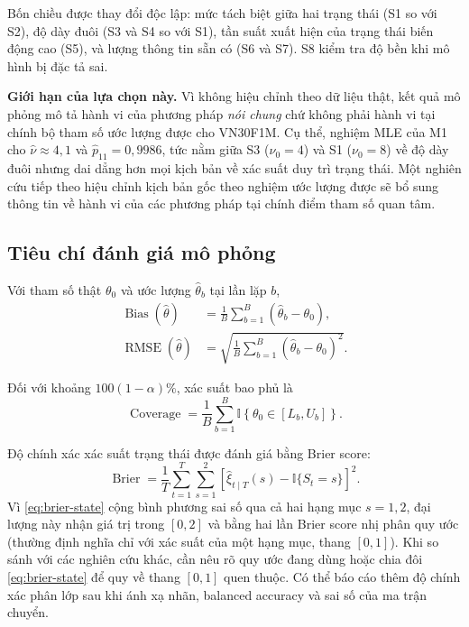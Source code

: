 \documentclass[12pt,a4paper]{article}
\numberwithin{equation}{section}
\newcommand{\RMSE}{\operatorname{RMSE}}
\newcommand{\ind}{\mathbb{I}}
\begin{document}
Bốn chiều được thay đổi độc lập: mức tách biệt giữa hai trạng thái (S1 so với S2), độ dày đuôi (S3 và S4 so với S1), tần suất xuất hiện của trạng thái biến động cao (S5), và lượng thông tin sẵn có (S6 và S7). S8 kiểm tra độ bền khi mô hình bị đặc tả sai.

\textbf{Giới hạn của lựa chọn này.} Vì không hiệu chỉnh theo dữ liệu thật, kết quả mô phỏng mô tả hành vi của phương pháp \emph{nói chung} chứ không phải hành vi tại chính bộ tham số ước lượng được cho VN30F1M. Cụ thể, nghiệm MLE của M1 cho $\hat\nu \approx 4{,}1$ và $\hat p_{11} = 0{,}9986$, tức nằm giữa S3 ($\nu_0 = 4$) và S1 ($\nu_0 = 8$) về độ dày đuôi nhưng dai dẳng hơn mọi kịch bản về xác suất duy trì trạng thái. Một nghiên cứu tiếp theo hiệu chỉnh kịch bản gốc theo nghiệm ước lượng được sẽ bổ sung thông tin về hành vi của các phương pháp tại chính điểm tham số quan tâm.

\subsection{Tiêu chí đánh giá mô phỏng}\label{subsec:simulation-metrics}

Với tham số thật $\theta_0$ và ước lượng $\widehat\theta_b$ tại lần lặp $b$,
\begin{align}
  \operatorname{Bias}(\widehat\theta)
  &=
  \frac{1}{B}\sum_{b=1}^{B}(\widehat\theta_b-\theta_0),
  \label{eq:bias}\\
  \RMSE(\widehat\theta)
  &=
  \sqrt{\frac{1}{B}\sum_{b=1}^{B}(\widehat\theta_b-\theta_0)^2}.
  \label{eq:parameter-rmse}
\end{align}

Đối với khoảng $100(1-\alpha)\%$, xác suất bao phủ là
\begin{equation}
  \operatorname{Coverage}
  =
  \frac{1}{B}
  \sum_{b=1}^{B}
  \ind\!\left\{
    \theta_0\in[L_b,U_b]
  \right\}.
  \label{eq:coverage}
\end{equation}

Độ chính xác xác suất trạng thái được đánh giá bằng Brier score:
\begin{equation}
  \operatorname{Brier}
  =
  \frac{1}{T}
  \sum_{t=1}^{T}
  \sum_{s=1}^{2}
  \left[
    \widehat\xi_{t\mid T}(s)-\ind\{S_t=s\}
  \right]^2.
  \label{eq:brier-state}
\end{equation}
Vì \cref{eq:brier-state} cộng bình phương sai số qua cả hai hạng mục $s=1,2$, đại lượng này nhận giá trị trong $[0,2]$ và bằng hai lần Brier score nhị phân quy ước (thường định nghĩa chỉ với xác suất của một hạng mục, thang $[0,1]$). Khi so sánh với các nghiên cứu khác, cần nêu rõ quy ước đang dùng hoặc chia đôi \cref{eq:brier-state} để quy về thang $[0,1]$ quen thuộc. Có thể báo cáo thêm độ chính xác phân lớp sau khi ánh xạ nhãn, balanced accuracy và sai số của ma trận chuyển.
\end{document}
